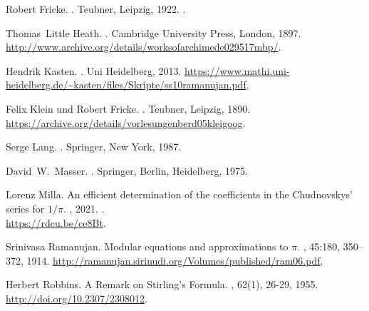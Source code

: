 Robert Fricke.
.
\newblock Teubner, Leipzig, 1922.
.
\medskip

Thomas~Little Heath.
.
\newblock Cambridge University Press, London, 1897.
\newblock
  {\scriptsize\url{http://www.archive.org/details/worksofarchimede029517mbp/}}.
\medskip

Hendrik Kasten.
.
\newblock Uni Heidelberg, 2013.
\newblock
  {\scriptsize\url{https://www.mathi.uni-heidelberg.de/~kasten/files/Skripte/ss10ramanujan.pdf}}.
\medskip

Felix Klein und Robert Fricke.
.
\newblock Teubner, Leipzig, 1890.
\newblock
  {\scriptsize\url{https://archive.org/details/vorlesungenberd05kleigoog}}.
\medskip

Serge Lang.
.
\newblock Springer, New York, 1987.
\medskip

David~W.~Masser.
.
\newblock Springer, Berlin, Heidelberg, 1975.
\medskip

Lorenz Milla.
\newblock An efficient determination of the coefficients in the Chudnovskys' series for $1/\pi$.
, 2021.
.\\
\newblock %
 {\scriptsize\url{https://rdcu.be/ce8Bt}}.
\medskip

Srinivasa Ramanujan.
\newblock Modular equations and approximations to $ \pi $.
, 45:180, 350--372, 1914.
\newblock
  {\scriptsize\url{http://ramanujan.sirinudi.org/Volumes/published/ram06.pdf}}.
\medskip

Herbert Robbins.
\newblock A Remark on Stirling's Formula.
, 62(1), 26-29, 1955.
\newblock
  {\scriptsize\url{http://doi.org/10.2307/2308012}}.
\medskip

